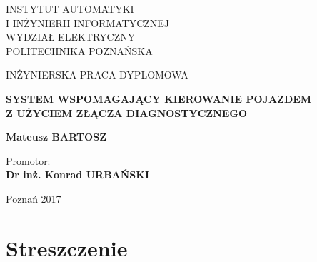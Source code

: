 \documentclass[12pt]{article} %
\numberwithin{equation}{subsection}
\numberwithin{figure}{section}
\numberwithin{table}{section}
\begin{document}
\begin{center}
\end{center}
\vspace{1cm} 
\begin{center}
	\large{INSTYTUT AUTOMATYKI\\I INŻYNIERII INFORMATYCZNEJ\\WYDZIAŁ ELEKTRYCZNY\\POLITECHNIKA POZNAŃSKA\\}
\end{center}
\vspace{2cm} 
\begin{center}
	INŻYNIERSKA PRACA DYPLOMOWA\\
\end{center}
\begin{center}
	\Large{\textbf{SYSTEM WSPOMAGAJĄCY KIEROWANIE POJAZDEM\\Z UŻYCIEM ZŁĄCZA DIAGNOSTYCZNEGO}}
\end{center}
\begin{center}
	\large{\textbf{Mateusz BARTOSZ}}
\end{center}
\vspace{4cm}
\begin{flushright}
	Promotor:\\\textbf{Dr inż. Konrad URBAŃSKI}\\
\end{flushright}
\vspace{4cm} 
\begin{center}
	Poznań 2017
\end{center}

\thispagestyle{empty}
\newpage


\pagestyle{fancy}
\rhead{\thepage}
\lhead{\slshape \rightmark}
\lfoot{}
\cfoot{}
\rfoot{}

\tableofcontents
\thispagestyle{empty}

\newpage
\thispagestyle{empty}
\section*{Streszczenie}
\vspace{0.5cm}
\hspace{0.5cm}
\newpage
\end{document}
